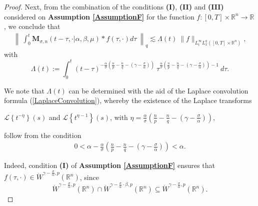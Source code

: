\documentclass{amsart}
\theoremstyle{definition}
\theoremstyle{remark}
\numberwithin{equation}{section}
\newcommand{\BR}{{\mathbb R}}
\begin{document}
\begin{proof}
			
			Next, from the combination of the conditions {\bf (I)}, {\bf (II)} and {\bf (III)} considered on {\bf Assumption \ref{AssumptionF}} for the function $f:[0,T]\times \mathbb{R}^n\longrightarrow \mathbb{R}$, we conclude that
			\begin{eqnarray}
				\label{MinkowskiIntIneq}
				\left\|~\displaystyle \int_0^t {\bm M}_{\sigma,n}(t-\tau,\cdot|\alpha,\beta,\mu)\ast  f(\tau,\cdot)d\tau~\right \|_q 
				\lesssim\Lambda(t)~\|f\|_{L^\infty_tL^q_x([0,T]\times\BR^n)},
			\end{eqnarray}
			with $$\displaystyle \Lambda(t):=\int_0^t (t-\tau)^{-\frac{\alpha}{\sigma}\left(\frac{n}{p}-\frac{n}{q}-\left(\gamma-\frac{\sigma}{\alpha}\right)\right)}~\tau^{\frac{\alpha}{\sigma}\left(\frac{n}{p}-\frac{n}{q}-\left(\gamma-\frac{\sigma}{\alpha}\right)\right)-1}~d\tau.$$
			
			We note that $\Lambda(t)$ can be determined with the aid of the Laplace convolution formula (\ref{LaplaceConvolution}), whereby the existence of the Laplace transforms
			\begin{center}
				$\displaystyle \mathcal{L}\left\{t^{-\eta}\right\}(s)$ and $\displaystyle\mathcal{L}\left\{t^{\eta-1}\right\}(s)$, with $\displaystyle \eta=\frac{\alpha}{\sigma}\left(\frac{n}{p}-\frac{n}{q}-\left(\gamma-\frac{\sigma}{\alpha}\right)\right)$,
			\end{center}
			follow from the condition
			\begin{eqnarray}
				\label{fDecayConstraint}		\displaystyle 0<\alpha-\frac{\alpha}{\sigma}\left(\frac{n}{p}-\frac{n}{q}-\left(\gamma-\frac{\sigma}{\alpha}\right)\right)< \alpha.
			\end{eqnarray}
			
			Indeed, condition {\bf (I)} of {\bf Assumption \ref{AssumptionF}} ensures that $f(\tau,\cdot)\in \dot{W}^{\gamma-\frac{\sigma}{\alpha},p}(\BR^n)$, since 
			$$\dot{W}^{\gamma-\frac{\sigma}{\alpha},p}(\BR^n)\cap \dot{W}^{\gamma-\frac{\sigma}{\alpha}\cdot\beta,p}(\BR^n)\subseteq\dot{W}^{\gamma-\frac{\sigma}{\alpha},p}(\BR^n).$$
			

\end{proof}
\end{document}
